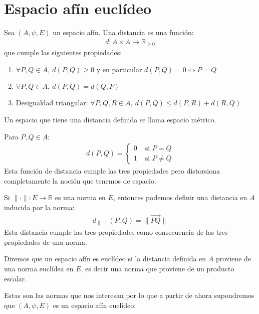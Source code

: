 \documentclass[14pt]{book}
\begin{document}
\chapter{Espacio afín euclídeo}
\begin{dfn}
	Sea $(A, \psi, E)$ un espacio afín. Una distancia es una función:
	\begin{align*}
		d:A \times A \to \mathbb{R}_{\geq 0}
	\end{align*}
	que cumple las siguientes propiedades:
	\begin{enumerate}
		\item $\forall P, Q \in A,\ d(P, Q) \geq 0$ y en particular $d(P, Q) = 0 \iff P = Q$
		\item $\forall P, Q \in A,\ d(P, Q) = d(Q, P)$
		\item Desigualdad triangular: $\forall P, Q, R \in A,\ d(P, Q) \leq d(P, R) + d(R, Q)$
	\end{enumerate}
	Un espacio que tiene una distancia definida se llama espacio métrico.
\end{dfn}

\begin{ej}Para $P, Q \in A$:
	\begin{align*} 
		d(P, Q) = \begin{cases}
		0 &\text{ si } P = Q \\
		1 &\text{ si } P ≠ Q
		\end{cases}
	\end{align*}
	Esta función de distancia cumple las tres propiedades pero distorsiona completamente la noción que tenemos de espacio.
\end{ej}

\begin{ej}
	Si $\lVert \cdot \rVert : E \to \mathbb{R}$ es una norma en $E$, entonces podemos definir una distancia en $A$ inducida por la norma:
	\begin{align*}
		d_{\lVert \cdot \rVert}(P, Q) = \lVert \overrightarrow{PQ} \rVert
	\end{align*}
	Esta distancia cumple las tres propiedades como consecuencia de las tres propiedades de una norma.
\end{ej}

\begin{dfn}
	Diremos que un espacio afín es euclídeo si la distancia definida en $A$ proviene de una norma euclídea en $E$, es decir una norma que proviene de un producto escalar.
\end{dfn}

Estas son las normas que nos interesan por lo que a partir de ahora supondremos que $(A, \psi, E)$ es un espacio afín euclídeo.
\end{document}

